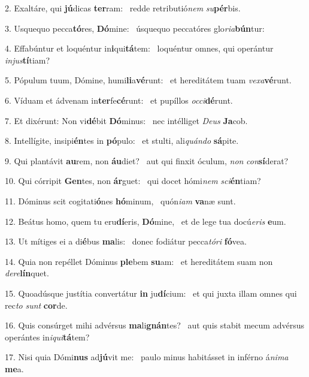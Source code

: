 2. Exaltáre, qui \textbf{jú}dicas \textbf{ter}ram: \ast\  redde retributió\textit{nem} \textit{su}\textbf{pér}bis.\

3. Usquequo pecca\textbf{tó}res, \textbf{Dó}mine: \ast\  úsquequo peccatóres glo\textit{ri}\textit{a}\textbf{bún}tur:\

4. Effabúntur et loquéntur in\textbf{i}qui\textbf{tá}tem: \ast\  loquéntur omnes, qui operántur \textit{in}\textit{jus}\textbf{tí}tiam?\

5. Pópulum tuum, Dómine, humi\textbf{li}a\textbf{vé}runt: \ast\  et hereditátem tuam \textit{ve}\textit{xa}\textbf{vé}runt.\

6. Víduam et ádvenam in\textbf{ter}fe\textbf{cé}runt: \ast\  et pupíllos \textit{oc}\textit{ci}\textbf{dé}runt.\

7. Et dixérunt: Non vi\textbf{dé}bit \textbf{Dó}minus: \ast\  nec intélliget \textit{De}\textit{us} \textbf{Ja}cob.\

8. Intellígite, insipi\textbf{én}tes in \textbf{pó}pulo: \ast\  et stulti, ali\textit{quán}\textit{do} \textbf{sá}pite.\

9. Qui plantávit \textbf{au}rem, non \textbf{áu}diet? \ast\  aut qui finxit óculum, \textit{non} \textit{con}\textbf{sí}derat?\

10. Qui córripit \textbf{Gen}tes, non \textbf{ár}guet: \ast\  qui docet hómi\textit{nem} \textit{sci}\textbf{én}tiam?\

11. Dóminus scit cogitati\textbf{ó}nes \textbf{hó}minum, \ast\  quón\textit{i}\textit{am} \textbf{va}næ sunt.\

12. Beátus homo, quem tu eru\textbf{dí}eris, \textbf{Dó}mine, \ast\  et de lege tua docú\textit{e}\textit{ris} \textbf{e}um.\

13. Ut mítiges ei a di\textbf{é}bus \textbf{ma}lis: \ast\  donec fodiátur pecca\textit{tó}\textit{ri} \textbf{fó}vea.\

14. Quia non repéllet Dóminus \textbf{ple}bem \textbf{su}am: \ast\  et hereditátem suam non \textit{de}\textit{re}\textbf{lín}quet.\

15. Quoadúsque justítia convertátur \textbf{in} ju\textbf{dí}cium: \ast\  et qui juxta illam omnes qui rec\textit{to} \textit{sunt} \textbf{cor}de.\

16. Quis consúrget mihi advérsus \textbf{ma}li\textbf{gnán}tes? \ast\  aut quis stabit mecum advérsus operántes in\textit{i}\textit{qui}\textbf{tá}tem?\

17. Nisi quia Dómi\textbf{nus} ad\textbf{jú}vit me: \ast\  paulo minus habitásset in inférno á\textit{ni}\textit{ma} \textbf{me}a.\

